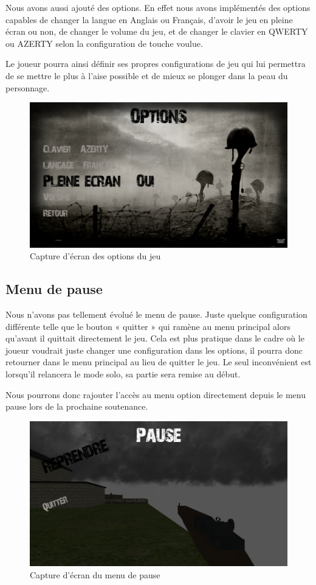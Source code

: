 \documentclass[11pt]{report}
\begin{document}
Nous avons aussi ajouté des options. En effet nous avons implémentés des options capables de changer la langue en Anglais ou Français, d’avoir le jeu en pleine écran ou non, de changer le volume du jeu, et de changer le clavier en QWERTY ou AZERTY selon la configuration de touche voulue.

Le joueur pourra ainsi définir ses propres configurations de jeu qui lui permettra de se mettre le plus à l'aise possible et de mieux se plonger dans la peau du personnage.

\begin{figure}[htbp]
\centering
\includegraphics[scale=0.13]{menu-option.png}
\caption{Capture d'écran des options du jeu}
\end{figure}

\subsection{Menu de pause}

Nous n’avons pas tellement évolué le menu de pause. Juste quelque configuration différente telle que le bouton « quitter » qui ramène au menu principal alors qu’avant il quittait directement le jeu. Cela est plus pratique dans le cadre où le joueur voudrait juste changer une configuration dans les options, il pourra donc retourner dans le menu principal au lieu de quitter le jeu. Le seul inconvénient est lorsqu’il relancera le mode solo, sa partie sera remise au début.

Nous pourrons donc rajouter l’accès au menu option directement depuis le menu pause lors de la prochaine soutenance.

\begin{figure}[htbp]
\centering
\includegraphics[scale=0.13]{menu-pause.png}
\caption{Capture d'écran du menu de pause}
\end{figure}
\end{document}
